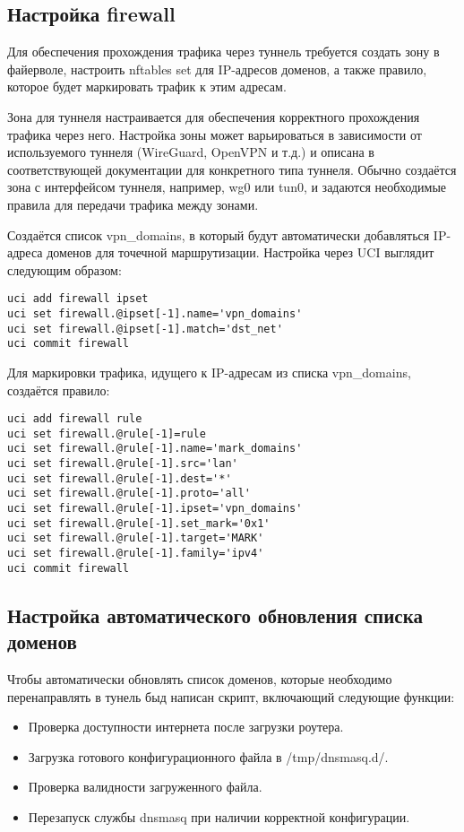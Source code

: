 \subsection{Настройка firewall}

Для обеспечения прохождения трафика через туннель требуется создать зону в файерволе, настроить nftables set для IP-адресов доменов, а также правило, которое будет маркировать трафик к этим адресам.

Зона для туннеля настраивается для обеспечения корректного прохождения трафика через него. Настройка зоны может варьироваться в зависимости от используемого туннеля (WireGuard, OpenVPN и т.д.) и описана в соответствующей документации для конкретного типа туннеля. Обычно создаётся зона с интерфейсом туннеля, например, wg0 или tun0, и задаются необходимые правила для передачи трафика между зонами.

Создаётся список vpn\_domains, в который будут автоматически добавляться IP-адреса доменов для точечной маршрутизации. Настройка через UCI выглядит следующим образом:

\begin{lstlisting}[frame=rlbt]
uci add firewall ipset
uci set firewall.@ipset[-1].name='vpn_domains'
uci set firewall.@ipset[-1].match='dst_net'
uci commit firewall
\end{lstlisting}

Для маркировки трафика, идущего к IP-адресам из списка vpn\_domains, создаётся правило:

\begin{lstlisting}[frame=rlbt]
uci add firewall rule
uci set firewall.@rule[-1]=rule
uci set firewall.@rule[-1].name='mark_domains'
uci set firewall.@rule[-1].src='lan'
uci set firewall.@rule[-1].dest='*'
uci set firewall.@rule[-1].proto='all'
uci set firewall.@rule[-1].ipset='vpn_domains'
uci set firewall.@rule[-1].set_mark='0x1'
uci set firewall.@rule[-1].target='MARK'
uci set firewall.@rule[-1].family='ipv4'
uci commit firewall
\end{lstlisting}

\subsection{Настройка автоматического обновления списка доменов}

Чтобы автоматически обновлять список доменов, которые необходимо перенаправлять
в тунель быд написан скрипт, включающий следующие функции:

\begin{itemize}
    \item Проверка доступности интернета после загрузки роутера.
    \item Загрузка готового конфигурационного файла в /tmp/dnsmasq.d/.
    \item Проверка валидности загруженного файла.
    \item Перезапуск службы dnsmasq при наличии корректной конфигурации.
\end{itemize}

